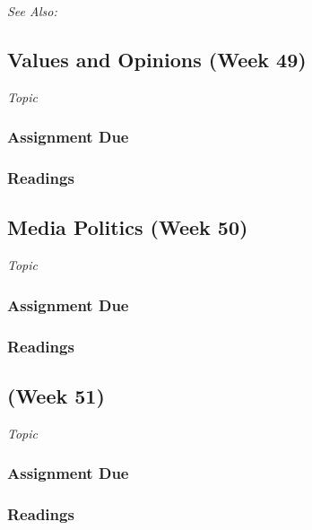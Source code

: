 \documentclass[12pt,a4paper]{article}
\newcommand{\seealso}{\noindent \emph{See Also:}\\}
\begin{document}




\seealso





\clearpage
\subsection{Values and Opinions (Week 49)}
\emph{Topic}
\vspace{1em}
\subsubsection*{Assignment Due}

\subsubsection*{Readings}



\clearpage
\subsection{Media Politics (Week 50)}
\emph{Topic}
\vspace{1em}
\subsubsection*{Assignment Due}

\subsubsection*{Readings}




\clearpage
\subsection{ (Week 51)}
\emph{Topic}
\vspace{1em}
\subsubsection*{Assignment Due}

\subsubsection*{Readings}




\end{document}
